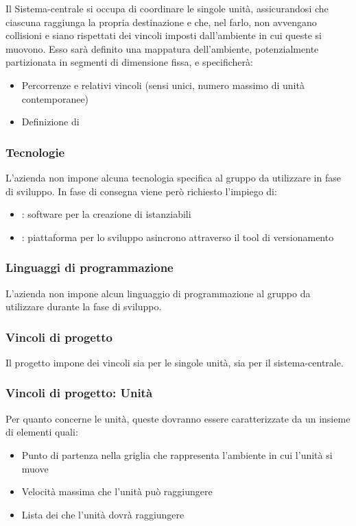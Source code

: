 \documentclass[]{article}
\begin{document}
			Il Sistema-centrale si occupa di coordinare le singole unità, assicurandosi che ciascuna raggiunga la propria destinazione e che, nel farlo, non avvengano collisioni e siano rispettati dei vincoli imposti dall'ambiente in cui queste si muovono.
			Esso sarà definito una mappatura dell'ambiente, potenzialmente partizionata in segmenti di dimensione fissa, e specificherà:
			\begin{itemize}
				\item Percorrenze e relativi vincoli (sensi unici, numero massimo di unità contemporanee)
				\item Definizione di 
			\end{itemize}

			\subsubsection{Tecnologie}
			L'azienda non impone alcuna tecnologia specifica al gruppo da utilizzare in fase di sviluppo.
			In fase di consegna viene però richiesto l'impiego di:
			\begin{itemize}
				\item \textsc{}: software per la creazione di  istanziabili
				\item \textsc{}: piattaforma per lo sviluppo asincrono attraverso il tool di versionamento 
			\end{itemize}

			\subsubsection{Linguaggi di programmazione}
			L'azienda non impone alcun linguaggio di programmazione al gruppo da utilizzare durante la fase di sviluppo.


			\subsubsection{Vincoli di progetto}
			Il progetto impone dei vincoli sia per le singole unità, sia per il sistema-centrale. \\
			\subsubsection{Vincoli di progetto: Unità}
			Per quanto concerne le unità, queste dovranno essere caratterizzate da un insieme di elementi quali:
			\begin{itemize}
				\item Punto di partenza nella griglia che rappresenta l'ambiente in cui l'unità si muove
				\item Velocità massima che l'unità può raggiungere
				\item Lista dei  che l'unità dovrà raggiungere
			\end{itemize}
\end{document}
